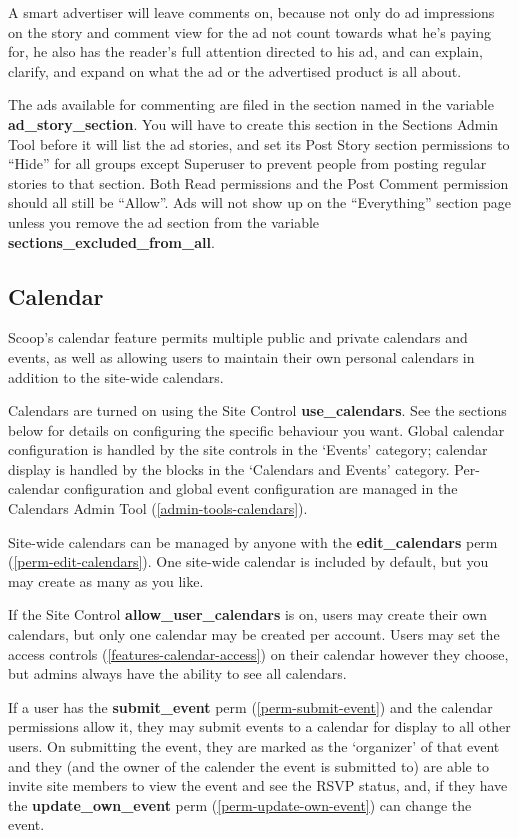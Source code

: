 A smart advertiser will leave comments on, because not only do ad impressions on the story and comment view for the ad not count towards what he's paying for, he also has the reader's full attention directed to his ad, and can explain, clarify, and expand on what the ad or the advertised product is all about.

The ads available for commenting are filed in the section named in the variable {\bf ad\_story\_section}.  You will have to create this section in the Sections Admin Tool before it will list the ad stories, and set its Post Story section permissions to ``Hide'' for all groups except Superuser to prevent people from posting regular stories to that section.  Both Read permissions and the Post Comment permission should all still be ``Allow''.  Ads will not show up on the ``Everything'' section page unless you remove the ad section from the variable {\bf sections\_excluded\_from\_all}.

\subsection{Calendar}
\label{features-calendar}

Scoop's calendar feature permits multiple public and private calendars and events, as well as allowing users to maintain their own personal calendars in addition to the site-wide calendars.

Calendars are turned on using the Site Control {\bf use\_calendars}. See the sections below for details on configuring the specific behaviour you want. Global calendar configuration is handled by the site controls in the `Events' category; calendar display is handled by the blocks in the `Calendars and Events' category. Per-calendar configuration and global event configuration are managed in the Calendars Admin Tool (\ref{admin-tools-calendars}).

Site-wide calendars can be managed by anyone with the {\bf edit\_calendars} perm (\ref{perm-edit-calendars}). One site-wide calendar is included by default, but you may create as many as you like. 

If the Site Control {\bf allow\_user\_calendars} is on, users may create their own calendars, but only one calendar may be created per account. Users may set the access controls (\ref{features-calendar-access}) on their calendar however they choose, but admins always have the ability to see all calendars.

If a user has the {\bf submit\_event} perm (\ref{perm-submit-event}) and the calendar permissions allow it, they may submit events to a calendar for display to all other users. On submitting the event, they are marked as the `organizer' of that event and they (and the owner of the calender the event is submitted to) are able to invite site members to view the event and see the RSVP status, and, if they have the {\bf update\_own\_event} perm (\ref{perm-update-own-event}) can change the event.


